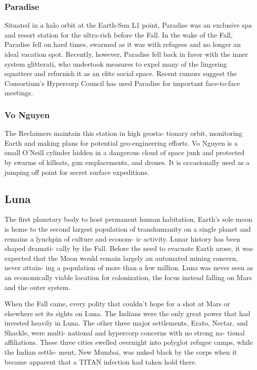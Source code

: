 \subsubsection{Paradise}

Situated in a halo orbit at the Earth-Sun L1 point, 
Paradise was an exclusive spa and resort station 
for the ultra-rich before the Fall. In the wake of the 
Fall, Paradise fell on hard times, swarmed as it was 
with refugees and no longer an ideal vacation spot. 
Recently, however, Paradise fell back in favor with the 
inner system glitterati, who undertook measures to 
expel many of the lingering squatters and refurnish 
it as an elite social space. Recent rumors suggest the 
Consortium's Hypercorp Council has used Paradise 
for important face-to-face meetings.

\subsubsection{Vo Nguyen}

The Reclaimers maintain this station in high geosta-
tionary orbit, monitoring Earth and making plans 
for potential geo-engineering efforts. Vo Nguyen is a 
small O'Neill cylinder hidden in a dangerous cloud of 
space junk and protected by swarms of killsats, gun 
emplacements, and drones. It is occasionally used as a 
jumping off point for secret surface expeditions.

\subsection{Luna}

The first planetary body to host permanent human 
habitation, Earth's sole moon is home to the second 
largest population of transhumanity on a single 
planet and remains a lynchpin of culture and econom-
ic activity. Lunar history has been shaped dramati-
cally by the Fall. Before the need to evacuate Earth 
arose, it was expected that the Moon would remain 
largely an automated mining concern, never attain-
ing a population of more than a few million. Luna 
was never seen as an economically viable location for 
colonization, the focus instead falling on Mars and 
the outer system.

When the Fall came, every polity that couldn't 
hope for a shot at Mars or elsewhere set its sights 
on Luna. The Indians were the only great power that 
had invested heavily in Luna. The other three major 
settlements, Erato, Nectar, and Shackle, were multi-
national and hypercorp concerns with no strong na-
tional affiliations. These three cities swelled overnight 
into polyglot refugee camps, while the Indian settle-
ment, New Mumbai, was nuked black by the corps 
when it became apparent that a TITAN infection had 
taken hold there.

